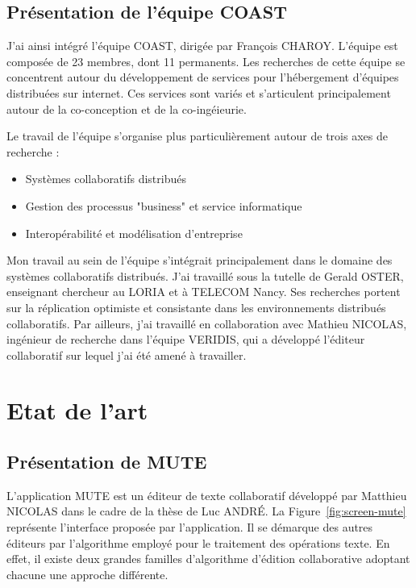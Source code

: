 \documentclass{tnreport}
\begin{document}
\section{Présentation de l'équipe COAST} 

J'ai ainsi intégré l'équipe COAST, dirigée par François CHAROY. L'équipe est composée de 23 membres, dont 11 permanents. Les recherches de cette équipe se concentrent autour du développement de services pour l'hébergement d'équipes distribuées sur internet. Ces services sont variés et s'articulent principalement autour de la co-conception et de la co-ingéieurie.

Le travail de l'équipe s'organise plus particulièrement autour de trois axes de recherche :

\begin{itemize}
  \item Systèmes collaboratifs distribués
  \item Gestion des processus "business" et service informatique
  \item Interopérabilité et modélisation d'entreprise
\end{itemize}

Mon travail au sein de l'équipe s'intégrait principalement dans le domaine des systèmes collaboratifs distribués. J'ai travaillé sous la tutelle de Gerald OSTER, enseignant chercheur au LORIA et à TELECOM Nancy. Ses recherches portent sur la réplication optimiste et consistante dans les environnements distribués collaboratifs. Par ailleurs, j'ai travaillé en collaboration avec Mathieu NICOLAS, ingénieur de recherche dans l'équipe VERIDIS, qui a développé l'éditeur collaboratif sur lequel j'ai été amené à travailler.  

\cleardoublepage


\chapter{Etat de l'art}

\section{Présentation de MUTE}

L'application MUTE est un éditeur de texte collaboratif développé par Matthieu NICOLAS dans le cadre de la thèse de Luc ANDRÉ. La Figure~\ref{fig:screen-mute} représente l'interface proposée par l'application. Il se démarque des autres éditeurs par l'algorithme employé pour le traitement des opérations texte. En effet, il existe deux grandes familles d'algorithme d'édition collaborative adoptant chacune une approche différente. 
\end{document}
